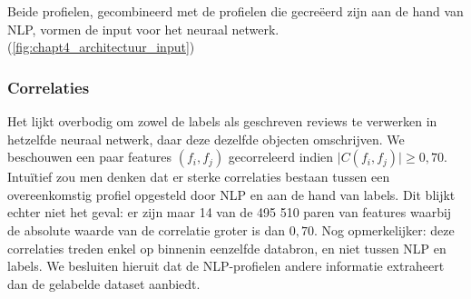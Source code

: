 Beide profielen, gecombineerd met de profielen die gecreëerd zijn aan de hand van NLP, vormen de input voor het neuraal netwerk. (\autoref{fig:chapt4_architectuur_input})




\subsubsection{Correlaties}
Het lijkt overbodig om zowel de labels als geschreven reviews te verwerken in hetzelfde neuraal netwerk, daar deze dezelfde objecten omschrijven. We beschouwen een paar features $(f_i, f_j)$ gecorreleerd indien $\lvert C(f_i, f_j) \rvert \ge 0,70$. Intuïtief zou men denken dat er sterke correlaties bestaan tussen een overeenkomstig profiel opgesteld door NLP en aan de hand van labels.\newline
Dit blijkt echter niet het geval: er zijn maar 14 van de 495 510 paren van features waarbij de absolute waarde van de correlatie groter is dan $0,70$. Nog opmerkelijker: deze correlaties treden enkel op binnenin eenzelfde databron, en niet tussen NLP en labels. We besluiten hieruit dat de NLP-profielen andere informatie extraheert dan de gelabelde dataset aanbiedt.

